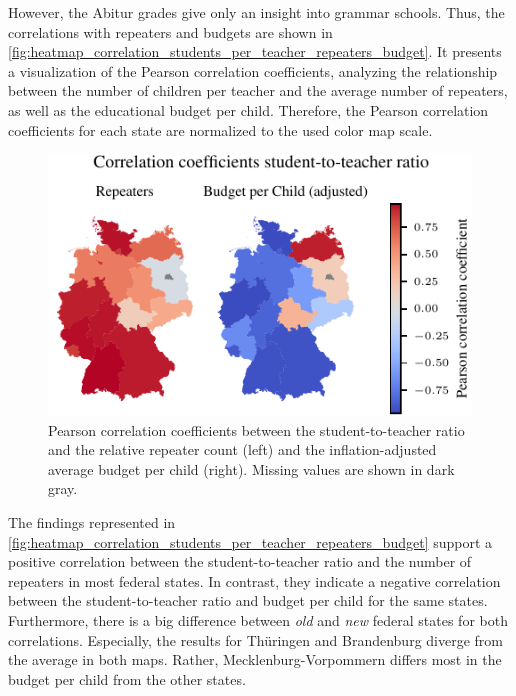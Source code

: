 However, the Abitur grades give only an insight into grammar schools. Thus, the correlations with repeaters and budgets are shown in \autoref{fig:heatmap_correlation_students_per_teacher_repeaters_budget}. It presents a visualization of the Pearson correlation coefficients, analyzing the relationship between the number of children per teacher and the average number of repeaters, as well as the educational budget per child. Therefore, the Pearson correlation coefficients for each state are normalized to the used color map scale.

\begin{figure}[ht]
    \centering
    \includegraphics{fig/fig_heatmap_correlation_students_per_teacher_repeaters_budget.pdf}
    \caption{Pearson correlation coefficients between the student-to-teacher ratio and the relative repeater count (left) and the inflation-adjusted average budget per child (right). Missing values are shown in \textcolor{TUdark}{dark gray}.}
    \label{fig:heatmap_correlation_students_per_teacher_repeaters_budget}
\end{figure}

The findings represented in \autoref{fig:heatmap_correlation_students_per_teacher_repeaters_budget} support a  positive correlation between the student-to-teacher ratio and the number of repeaters in most federal states. In contrast, they indicate a negative correlation between the student-to-teacher ratio  and budget per child for the same states. Furthermore, there is a big difference between \emph{old} and \emph{new} federal states for both correlations. Especially, the results for Thüringen and Brandenburg diverge from the average in both maps. Rather, Mecklenburg-Vorpommern differs most in the budget per child from the other states.

